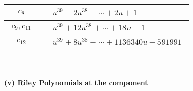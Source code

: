 \documentclass[1p]{elsarticle_modified}
\theoremstyle{definition}
\begin{document}
\begin{tabular}{m{50pt}|m{274pt}}
\hline $$\begin{aligned}c_{8}\end{aligned}$$&$\begin{aligned}
&u^{39}-2 u^{38}+\cdots+2 u+1
\end{aligned}$\\
\hline $$\begin{aligned}c_{9},c_{11}\end{aligned}$$&$\begin{aligned}
&u^{39}+12 u^{38}+\cdots+18 u-1
\end{aligned}$\\
\hline $$\begin{aligned}c_{12}\end{aligned}$$&$\begin{aligned}
&u^{39}+8 u^{38}+\cdots+1136340 u-591991
\end{aligned}$\\
\hline
\end{tabular}\\~\\
\newpage\renewcommand{\arraystretch}{1}
\flushleft \textbf{(v) Riley Polynomials at the component}\newline \\
\end{document}
